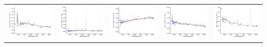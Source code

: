 \begin{center}
\begin{longtable}{l l l l l }
    \includegraphics[width=0.19\linewidth, clip]{Figs/Figs-sdss/spec-9163-58043-0440-STRIPE82-0120-045064.pdf} & \includegraphics[width=0.19\linewidth, clip]{Figs/Figs-sdss/spec-9166-58051-0118-STRIPE82-0132-037548.pdf} & \includegraphics[width=0.19\linewidth, clip]{Figs/Figs-sdss/spec-9168-58067-0396-STRIPE82-0136-026983.pdf} & \includegraphics[width=0.19\linewidth, clip]{Figs/Figs-sdss/spec-9172-58015-0449-STRIPE82-0148-018355.pdf} & \includegraphics[width=0.19\linewidth, clip]{Figs/Figs-sdss/spec-9180-57693-0793-STRIPE82-0120-000615.pdf} \\

\end{longtable}
\end{center}
